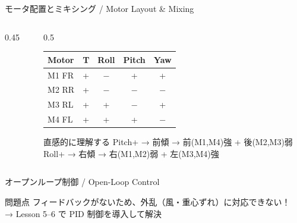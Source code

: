 \documentclass[aspectratio=169, 14pt]{beamer}
\begin{document}
\begin{frame}{モータ配置とミキシング / Motor Layout \& Mixing}
  \begin{columns}[T]
    \begin{column}{0.45\textwidth}
      \centering
      \resizebox{0.95\columnwidth}{!}{}
    \end{column}
    \begin{column}{0.5\textwidth}
      \begin{table}
        \centering\footnotesize
        \begin{tabular}{lcccc}
          \hline
          \textbf{Motor} & \textbf{T} & \textbf{Roll} & \textbf{Pitch} & \textbf{Yaw} \\
          \hline
          M1 FR & + & $-$ & + & + \\
          M2 RR & + & $-$ & $-$ & $-$ \\
          M3 RL & + & + & $-$ & + \\
          M4 FL & + & + & + & $-$ \\
          \hline
        \end{tabular}
      \end{table}

      \vspace{0.5em}

      \begin{exampleblock}{\footnotesize 直感的に理解する}
        \scriptsize
        Pitch+ → 前傾 → 前(M1,M4)強 + 後(M2,M3)弱\\
        Roll+ → 右傾 → 右(M1,M2)弱 + 左(M3,M4)強
      \end{exampleblock}
    \end{column}
  \end{columns}
\end{frame}

\begin{frame}{オープンループ制御 / Open-Loop Control}
  \begin{center}
    \resizebox{0.75\textwidth}{!}{}
  \end{center}

  \vspace{0.5em}

  \begin{alertblock}{問題点}
    フィードバックがないため、外乱（風・重心ずれ）に対応できない！\\
    → Lesson 5--6 で PID 制御を導入して解決
  \end{alertblock}
\end{frame}
\end{document}
